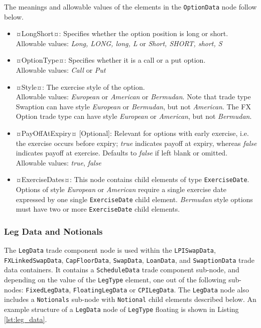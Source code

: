 The meanings and allowable values of the elements in the \lstinline!OptionData! node follow below.

\begin{itemize}
\item ¤LongShort¤: Specifies whether the option position is long  or short.  \\Allowable values: \emph{Long, LONG, long, L} or \emph{Short, SHORT, short, S}
\item ¤OptionType¤: Specifies whether it is a call or a put option. \\Allowable values: \emph{Call} or \emph{Put} 
\item ¤Style¤: The exercise style of the option. \\Allowable values: \emph{European} or \emph{American} or \emph{Bermudan}. Note that trade type Swaption can have style  \emph{European} or  \emph{Bermudan}, but not \emph{American}. The FX Option trade type can have style \emph{European} or \emph{American}, but not \emph{Bermudan}.
\item ¤PayOffAtExpiry¤ [Optional]: Relevant for options with early exercise, i.e. the exercise occurs before expiry; \emph{true}  indicates payoff at expiry, whereas \emph{false}  indicates payoff at exercise. Defaults to \emph{false}  if left blank or omitted. \\Allowable values: \emph{true}, \emph{false}
\item ¤ExerciseDates¤: This node contains child elements of type \lstinline!ExerciseDate!.  Options of style \emph{European} or \emph{American} require a single exercise date expressed by one single \lstinline!ExerciseDate! child element.  \emph{Bermudan} style options must have two or more \lstinline!ExerciseDate! child elements.


\end{itemize}



\subsubsection{Leg Data and Notionals}
\label{ss:leg_data}

The \lstinline!LegData! trade component node is used within the \lstinline!LPISwapData!, \lstinline!FXLinkedSwapData!, \lstinline!CapFloorData!,  \lstinline!SwapData!, \lstinline!LoanData!, and \lstinline!SwaptionData! trade data containers. It contains a \lstinline!ScheduleData! trade component sub-node, and depending on the value of the \lstinline!LegType! element, one out of the following sub-nodes:  \lstinline!FixedLegData!, \lstinline!FloatingLegData! or \lstinline!CPILegData!. The \lstinline!LegData! node also includes a \lstinline!Notionals! sub-node  with \lstinline!Notional! child elements described below. An example structure of a \lstinline!LegData! node of \lstinline!LegType! floating is shown in Listing \ref{lst:leg_data}.

